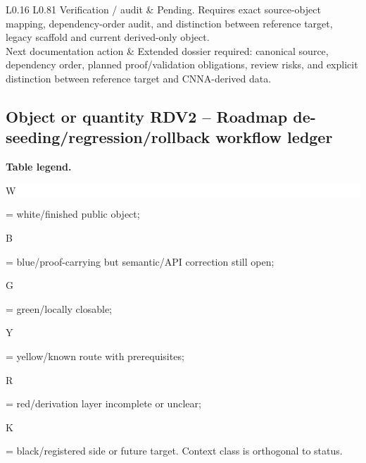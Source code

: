 \begin{longtable}{L{0.16\linewidth} L{0.81\linewidth}}
\hline\addlinespace[0.20em]
Verification /\allowbreak{} audit & Pending. Requires exact source-object mapping, dependency-order audit, and distinction between reference target, legacy scaffold and current derived-only object.\\
\hline\addlinespace[0.20em]
Next documentation action & Extended dossier required: canonical source, dependency order, planned proof/\allowbreak{}validation obligations, review risks, and explicit distinction between reference target and CNNA-derived data.\\
\hline\addlinespace[0.20em]
\end{longtable}
\subsection*{Object or quantity RDV2 -- Roadmap de-seeding/\allowbreak{}regression/\allowbreak{}rollback workflow ledger}
\hypertarget{objproof:RDV2}{}
\par\smallskip\noindent\begin{minipage}{0.99\linewidth}\footnotesize\raggedright\textbf{Table legend.} \colorbox{white}{\strut W} = white/finished public object; \colorbox{cyan!20}{\strut B} = blue/proof-carrying but semantic/API correction still open; \colorbox{green!18}{\strut G} = green/locally closable; \colorbox{yellow!25}{\strut Y} = yellow/known route with prerequisites; \colorbox{red!20}{\strut R} = red/derivation layer incomplete or unclear; \colorbox{black!18}{\strut K} = black/registered side or future target. Context class is orthogonal to status.\end{minipage}\par\vspace{0.25em}
